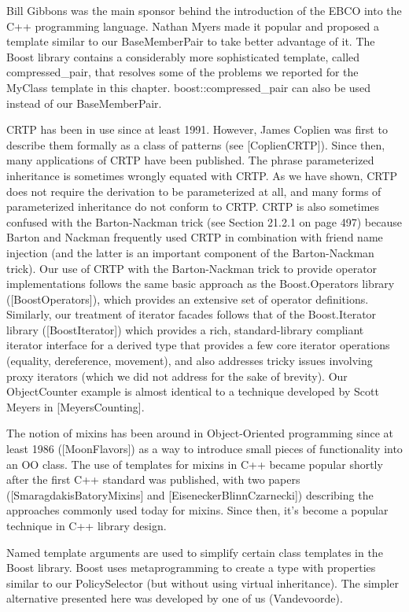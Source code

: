Bill Gibbons was the main sponsor behind the introduction of the EBCO into the C++ programming language. Nathan Myers made it popular and proposed a template similar to our BaseMemberPair to take better advantage of it. The Boost library contains a considerably more sophisticated template, called compressed\_pair, that resolves some of the problems we reported for the MyClass template in this chapter. boost::compressed\_pair can also be used instead of our BaseMemberPair.

CRTP has been in use since at least 1991. However, James Coplien was first to describe them formally as a class of patterns (see [CoplienCRTP]). Since then, many applications of CRTP have been published. The phrase parameterized inheritance is sometimes wrongly equated with CRTP. As we have shown, CRTP does not require the derivation to be parameterized at all, and many forms of parameterized inheritance do not conform to CRTP. CRTP is also sometimes confused with the Barton-Nackman trick (see Section 21.2.1 on page 497) because Barton and Nackman frequently used CRTP in combination with friend name injection (and the latter is an important component of the Barton-Nackman trick). Our use of CRTP with the Barton-Nackman trick to provide operator implementations follows the same basic approach as the Boost.Operators library ([BoostOperators]), which provides an extensive set of operator definitions. Similarly, our treatment of iterator facades follows that of the Boost.Iterator library ([BoostIterator]) which provides a rich, standard-library compliant iterator interface for a derived type that provides a few core iterator operations (equality, dereference, movement), and also addresses tricky issues involving proxy iterators (which we did not address for the sake of brevity). Our ObjectCounter example is almost identical to a technique developed by Scott Meyers in [MeyersCounting].

The notion of mixins has been around in Object-Oriented programming since at least 1986 ([MoonFlavors]) as a way to introduce small pieces of functionality into an OO class. The use of templates for mixins in C++ became popular shortly after the first C++ standard was published, with two papers ([SmaragdakisBatoryMixins] and [EiseneckerBlinnCzarnecki]) describing the approaches commonly used today for mixins. Since then, it’s become a popular technique in C++ library design.

Named template arguments are used to simplify certain class templates in the Boost library. Boost uses metaprogramming to create a type with properties similar to our PolicySelector (but without using virtual inheritance). The simpler alternative presented here was developed by one of us (Vandevoorde).